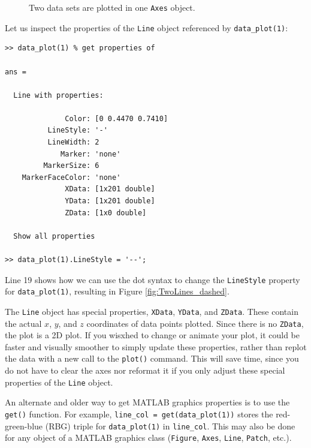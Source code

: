 \begin{figure}[htbp] %
   \centering
   \quad
   \caption{Two data sets are plotted in one \texttt{Axes} object.}
   \label{fig:MultiLinePlot}
\end{figure}

Let us inspect the properties of the \texttt{Line} object referenced by \texttt{data\_plot(1)}:
\begin{lstlisting}[style=Matlab-editor, caption={The properties of \texttt{data\_plot(1)}.}]
>> data_plot(1) % get properties of

ans = 

  Line with properties:

              Color: [0 0.4470 0.7410]
          LineStyle: '-'
          LineWidth: 2
             Marker: 'none'
         MarkerSize: 6
    MarkerFaceColor: 'none'
              XData: [1x201 double]
              YData: [1x201 double]
              ZData: [1x0 double]

  Show all properties

>> data_plot(1).LineStyle = '--';
\end{lstlisting}
Line 19 shows how we can use the dot syntax to change the \texttt{LineStyle} property for \texttt{data\_plot(1)}, resulting in Figure \ref{fig:TwoLines_dashed}.

The \texttt{Line} object has special properties, \texttt{XData}, \texttt{YData}, and \texttt{ZData}. These contain the actual \(x\), \(y\), and \(z\) coordinates of data points plotted. Since there is no \texttt{ZData}, the plot is a 2D plot. If you wisxhed to change or animate your plot, it could be faster and visually smoother to simply update these properties, rather than replot the data with a new call to the \texttt{plot()} command. This will save time, since you do not have to clear the axes nor reformat it if you only adjust these special properties of the \texttt{Line} object.

An alternate and older way to get MATLAB graphics properties is to use the \texttt{get()} function. For example, \texttt{line\_col = get(data\_plot(1))} stores the red-green-blue (RBG) triple for \texttt{data\_plot(1)} in \texttt{line\_col}. This may also be done for any object of a MATLAB graphics class (\texttt{Figure}, \texttt{Axes}, \texttt{Line}, \texttt{Patch}, etc.).

